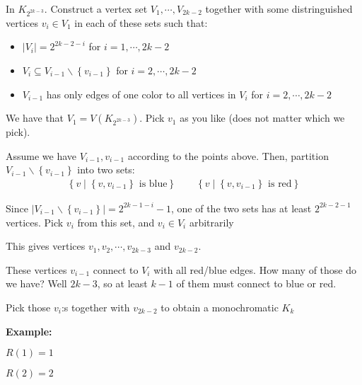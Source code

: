 \begin{prf}
  In $K_{2^{2k-3}}$. Construct a vertex set $V_1,\cdots, V_{2k-2}$ together with some distringuished vertices $v_i\in V_1$  in each of these sets such that:\par
  \begin{itemize}
    \item$\left|V_i\right| =2^{2k-2-i}$ for $i = 1,\cdots,2k-2$\par
    \item $V_i\subseteq V_{i-1}\backslash\left\{v_{i-1}\right\}$ for $i = 2,\cdots,2k-2$\par
    \item $V_{i-1}$ has only edges of one color to all vertices in $V_i$ for $i = 2,\cdots,2k-2$
  \end{itemize}
  \par\bigskip
  \noindent We have that $V_1 = V(K_{2^{2k-3}})$. Pick $v_1$ as you like (does not matter which we pick).
  \par\bigskip
  \noindent Assume we have $V_{i-1},v_{i-1}$ according to the points above. Then, partition $V_{i-1}\backslash\left\{v_{i-1}\right\}$ into two sets:
  \begin{equation*}
    \begin{gathered}
      \left\{v\;|\;\left\{v,v_{i-1}\right\}\text{ is blue}\right\}\qquad \left\{v\;|\;\left\{v,v_{i-1}\right\}\text{ is red}\right\}
    \end{gathered}
  \end{equation*}
  \par\bigskip
  \noindent Since $\left|V_{i-1}\backslash\left\{v_{i-1}\right\}\right| = 2^{2k-1-i}-1$, one of the two sets has at least $2^{2k-2-1}$ vertices. Pick $v_i$ from this set, and $v_i\in V_i$ arbitrarily
  \par\bigskip
  \noindent This gives vertices $v_1,v_2,\cdots,v_{2k-3}$ and $v_{2k-2}$.
  \par\bigskip
  \noindent These vertices $v_{i-1}$ connect to $V_i$ with all red/blue edges. How many of those do we have? Well $2k-3$, so at least $k-1$ of them must connect to blue or red.
  \par\bigskip
  \noindent Pick those $v_i$:s together with $v_{2k-2}$ to obtain a monochromatic $K_k$
\end{prf}
\par\bigskip
\noindent\textbf{Example:}\par
\noindent $R(1) = 1$\par
\noindent $R(2) = 2$\par

